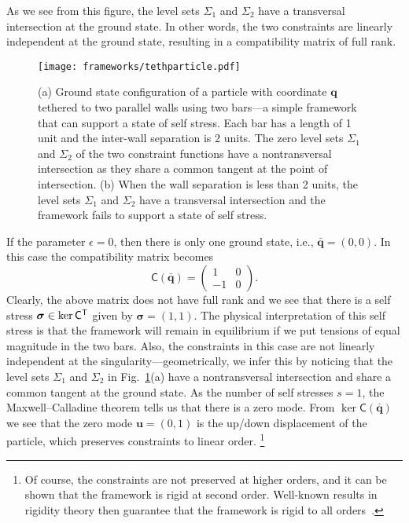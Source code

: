 \begin{example*}
As we see from this figure, the level sets $\Sigma_{1}$ and $\Sigma_{2}$ have a transversal intersection at the ground state.
In other words, the two constraints are linearly independent at the ground state, resulting in a compatibility matrix of full rank.
%
\begin{figure}
  \begin{center}
    \texttt{[image: frameworks/tethparticle.pdf]}
  \end{center}
  \caption{(a) Ground state configuration of a particle with coordinate $\bm{q}$ tethered to two parallel walls using two bars---a simple framework that can support a state of self stress.
    Each bar has a length of 1 unit and the inter-wall separation is 2 units.
  The zero level sets $\Sigma_1$ and $\Sigma_2$ of the two constraint functions have a nontransversal intersection as they share a common tangent at the point of intersection.
  (b) When the wall separation is less than 2 units, the level sets $\Sigma_{1}$ and $\Sigma_{2}$ have a transversal intersection and the framework fails to support a state of self stress.
}
  \label{fig:tether}
\end{figure}

If the parameter $\epsilon = 0$, then there is only one ground state, i.e., $\bm{\bar{q}} = (0, 0)$.
In this case the compatibility matrix becomes
%
\begin{equation}
  \mathsf{C}(\bar{\bm{q}}) =
  \begin{pmatrix}
    1 & 0\\
    -1 & 0
  \end{pmatrix}.
\end{equation}
%
Clearly, the above matrix does not have full rank and we see that there is a self stress $\bm{\sigma} \in \ker \mathsf{C}^\mathsf{T}$ given by $\bm{\sigma} = \left(1, 1\right)$.
The physical interpretation of this self stress is that the framework will remain in equilibrium if we put tensions of equal magnitude in the two bars.
Also, the constraints in this case are not linearly independent at the singularity---geometrically, we infer this by noticing that the level sets $\Sigma_{1}$ and $\Sigma_{2}$ in Fig.~\ref{fig:tether}(a) have a nontransversal intersection and share a common tangent at the ground state.
As the number of self stresses $s = 1$, the Maxwell--Calladine theorem tells us that there is a zero mode.
From $\ker\mathsf{C}(\bar{\bm{q}})$ we see that the zero mode $\bm{u} = (0, 1)$ is the up/down displacement of the particle, which preserves constraints to linear order.%
\footnote{Of course, the constraints are not preserved at higher orders, and it can be shown that the framework is rigid at second order.  Well-known results in rigidity theory then guarantee that the framework is rigid to all orders~\cite{connelly2022}.}
\end{example*}


